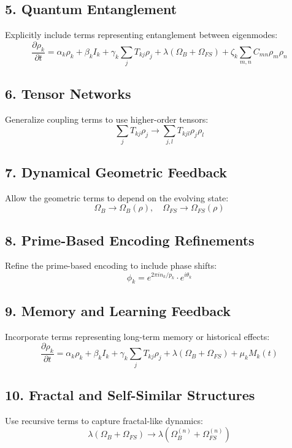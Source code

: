 \documentclass{article}
\theoremstyle{plain}
\begin{document}
\subsection*{5. Quantum Entanglement}
Explicitly include terms representing entanglement between eigenmodes:
\begin{equation}
\frac{\partial \rho_k}{\partial t} = \alpha_k \rho_k + \beta_k I_k + \gamma_k \sum_j T_{kj} \rho_j + \lambda (\Omega_B + \Omega_{FS}) + \zeta_k \sum_{m,n} C_{mn} \rho_m \rho_n
\end{equation}

\subsection*{6. Tensor Networks}
Generalize coupling terms to use higher-order tensors:
\begin{equation}
\sum_j T_{kj} \rho_j \to \sum_{j,l} T_{kjl} \rho_j \rho_l
\end{equation}

\subsection*{7. Dynamical Geometric Feedback}
Allow the geometric terms to depend on the evolving state:
\begin{equation}
\Omega_B \to \Omega_B(\rho), \quad \Omega_{FS} \to \Omega_{FS}(\rho)
\end{equation}

\subsection*{8. Prime-Based Encoding Refinements}
Refine the prime-based encoding to include phase shifts:
\begin{equation}
\phi_k = e^{2\pi i n_k / p_k} \cdot e^{i\theta_k}
\end{equation}

\subsection*{9. Memory and Learning Feedback}
Incorporate terms representing long-term memory or historical effects:
\begin{equation}
\frac{\partial \rho_k}{\partial t} = \alpha_k \rho_k + \beta_k I_k + \gamma_k \sum_j T_{kj} \rho_j + \lambda (\Omega_B + \Omega_{FS}) + \mu_k M_k(t)
\end{equation}

\subsection*{10. Fractal and Self-Similar Structures}
Use recursive terms to capture fractal-like dynamics:
\begin{equation}
\lambda (\Omega_B + \Omega_{FS}) \to \lambda (\Omega_B^{(n)} + \Omega_{FS}^{(n)})
\end{equation}
\end{document}
